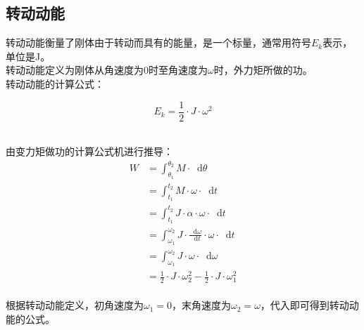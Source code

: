 \documentclass[UTF8]{ctexart}
\newcommand*{\dif}{\mathop{}\!\mathrm{d}}
\begin{document}
\subsection{转动动能}
    \setcounter{equation}{0}
    转动动能衡量了刚体由于转动而具有的能量，是一个标量，通常用符号$E_k$表示，单位是\si{J}。\\[3mm]
    转动动能定义为刚体从角速度为$0$时至角速度为$\omega$时，外力矩所做的功。\\[3mm]
    转动动能的计算公式：
    \begin{large}
        \begin{equation*}
            E_k=\frac{1}{2}\cdot J\cdot\omega^2
        \end{equation*}
    \end{large}\\
    由变力矩做功的计算公式机进行推导：
    \begin{align}
        W
        &=\int_{\theta_1}^{\theta_2}M\cdot\dif\theta\\[3mm]
        &=\int_{t_1}^{t_2}M\cdot\omega\cdot\dif t\\[3mm]
        &=\int_{t_1}^{t_2}J\cdot\alpha\cdot\omega\cdot\dif t\\[3mm]
        &=\int_{\omega_1}^{\omega_2}J\cdot\frac{\dif\omega}{\dif t}\cdot\omega\cdot\dif t\\[3mm]
        &=\int_{\omega_1}^{\omega_2}J\cdot\omega\cdot\dif\omega\\[3mm]
        &=\frac{1}{2}\cdot J\cdot\omega_2^2-\frac{1}{2}\cdot J\cdot\omega_1^2
    \end{align}\\
    根据转动动能定义，初角速度为$\omega_1=0$，末角速度为$\omega_2=\omega$，代入即可得到转动动能的公式。

\newpage
\end{document}
